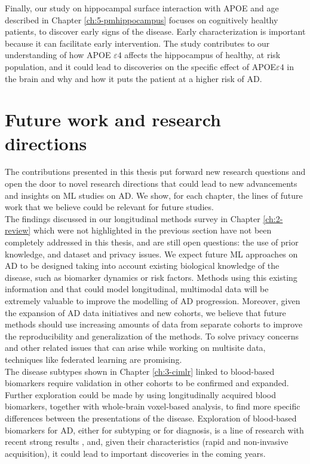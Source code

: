 Finally, our study on hippocampal surface interaction with APOE and age described in Chapter \ref{ch:5-pmhippocampus} focuses on cognitively healthy patients, to discover early signs of the disease. Early characterization is important because it can facilitate early intervention. The study contributes to our understanding of how APOE $\varepsilon4$ affects the hippocampus of healthy, at risk population, and it could lead to discoveries on the specific effect of APOE$\varepsilon4$ in the brain and why and how it puts the patient at a higher risk of AD.

\section{Future work and research directions}

The contributions presented in this thesis put forward new research questions and open the door to novel research directions that could lead to new advancements and insights on ML studies on AD. We show, for each chapter, the lines of future work that we believe could be relevant for future studies. \\

The findings discussed in our longitudinal methods survey in Chapter \ref{ch:2-review} which were not highlighted in the previous section have not been completely addressed in this thesis, and are still open questions: the use of prior knowledge, and dataset and privacy issues. We expect future ML approaches on AD to be designed taking into account existing biological knowledge of the disease, such as biomarker dynamics or risk factors. Methods using this existing information and that could model longitudinal, multimodal data will be extremely valuable to improve the modelling of AD progression. Moreover, given the expansion of AD data initiatives and new cohorts, we believe that future methods should use increasing amounts of data from separate cohorts to improve the reproducibility and generalization of the methods. To solve privacy concerns and other related issues that can arise while working on multisite data, techniques like federated learning \cite{Yang2019} are promising. \\

The disease subtypes shown in Chapter \ref{ch:3-cimlr} linked to blood-based biomarkers require validation in other cohorts to be confirmed and expanded. Further exploration could be made by using longitudinally acquired blood biomarkers, together with whole-brain voxel-based analysis, to find more specific differences between the presentations of the disease. Exploration of blood-based biomarkers for AD, either for subtyping or for diagnosis, is a line of research with recent strong results \cite{Cullen2020,Moscoso2020}, and, given their characteristics (rapid and non-invasive acquisition), it could lead to important discoveries in the coming years. \\

